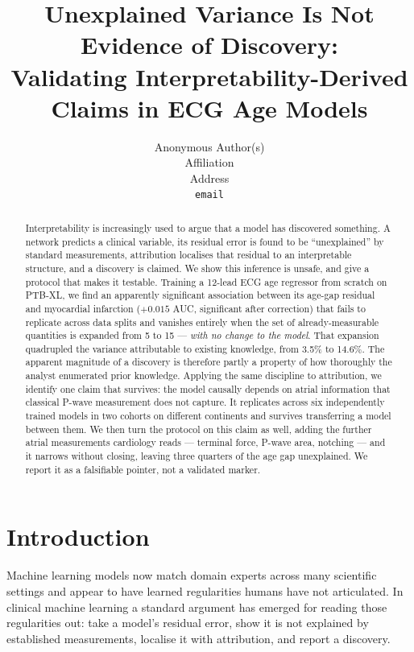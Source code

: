 \documentclass{article}
\title{Unexplained Variance Is Not Evidence of Discovery:\\
Validating Interpretability-Derived Claims in ECG Age Models}
\author{Anonymous Author(s)\\
Affiliation\\
Address\\
\texttt{email}}
\begin{document}
\maketitle

\begin{abstract}
Interpretability is increasingly used to argue that a model has discovered
something. A network predicts a clinical variable, its residual error is found
to be ``unexplained'' by standard measurements, attribution localises that
residual to an interpretable structure, and a discovery is claimed. We show this
inference is unsafe, and give a protocol that makes it testable.
Training a 12-lead ECG age regressor from scratch on PTB-XL, we find an
apparently significant association between its age-gap residual and myocardial
infarction ($+0.015$ AUC, significant after correction) that fails to replicate
across data splits and vanishes entirely when the set of already-measurable
quantities is expanded from 5 to 15 --- \emph{with no change to the model}. That
expansion quadrupled the variance attributable to existing knowledge, from
3.5\% to 14.6\%. The apparent magnitude of a discovery is therefore partly a
property of how thoroughly the analyst enumerated prior knowledge.
Applying the same discipline to attribution, we identify one claim that
survives: the model causally depends on atrial information that classical
P-wave measurement does not capture. It replicates across six independently
trained models in two cohorts on different continents and survives transferring
a model between them. We then turn the protocol on this claim as well, adding the
further atrial measurements cardiology reads --- terminal force, P-wave area,
notching --- and it narrows without closing, leaving three quarters of the age
gap unexplained. We report it as a falsifiable pointer, not a validated marker.
\end{abstract}

\section{Introduction}

Machine learning models now match domain experts across many scientific settings
and appear to have learned regularities humans have not articulated. In clinical
machine learning a standard argument has emerged for reading those regularities
out: take a model's residual error, show it is not explained by established
measurements, localise it with attribution, and report a discovery.
\end{document}
